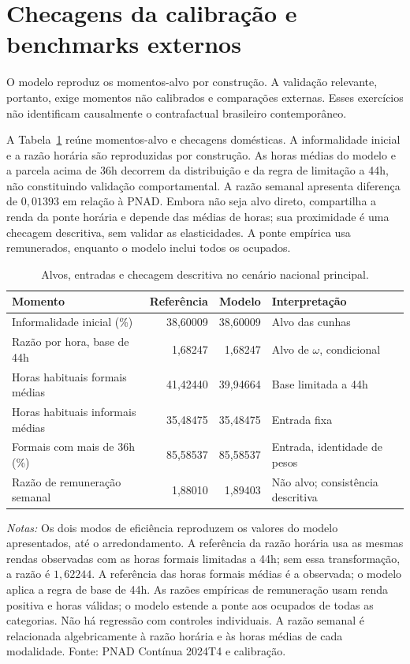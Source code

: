 \section{Checagens da calibração e benchmarks externos}\label{sec:validation}

O modelo reproduz os momentos-alvo por construção. A validação relevante, portanto, exige momentos não calibrados e comparações externas. Esses exercícios não identificam causalmente o contrafactual brasileiro contemporâneo.

A Tabela~\ref{tab:calibration_fit} reúne momentos-alvo e checagens domésticas. A informalidade inicial e a razão horária são reproduzidas por construção. As horas médias do modelo e a parcela acima de 36h decorrem da distribuição e da regra de limitação a 44h, não constituindo validação comportamental. A razão semanal apresenta diferença de $0{,}01393$ em relação à PNAD. Embora não seja alvo direto, compartilha a renda da ponte horária e depende das médias de horas; sua proximidade é uma checagem descritiva, sem validar as elasticidades. A ponte empírica usa remunerados, enquanto o modelo inclui todos os ocupados.

\begin{table}[t]
\centering
\caption{Alvos, entradas e checagem descritiva no cenário nacional principal.}\label{tab:calibration_fit}
\normalsize
\begin{tabular}{@{}p{6.1cm}rrp{4.4cm}@{}}
\toprule
Momento & Referência & Modelo & Interpretação \\
\midrule
Informalidade inicial (\%) & 38{,}60009 & 38{,}60009 & Alvo das cunhas \\
Razão por hora, base de 44h & 1{,}68247 & 1{,}68247 & Alvo de $\omega$, condicional \\
Horas habituais formais médias & 41{,}42440 & 39{,}94664 & Base limitada a 44h \\
Horas habituais informais médias & 35{,}48475 & 35{,}48475 & Entrada fixa \\
Formais com mais de 36h (\%) & 85{,}58537 & 85{,}58537 & Entrada, identidade de pesos \\
Razão de remuneração semanal & 1{,}88010 & 1{,}89403 & Não alvo; consistência descritiva \\
\bottomrule
\end{tabular}
\begin{minipage}{0.97\textwidth}
\normalsize\justifying
\textit{Notas:} Os dois modos de eficiência reproduzem os valores do modelo apresentados, até o arredondamento. A referência da razão horária usa as mesmas rendas observadas com as horas formais limitadas a 44h; sem essa transformação, a razão é $1{,}62244$. A referência das horas formais médias é a observada; o modelo aplica a regra de base de 44h. As razões empíricas de remuneração usam renda positiva e horas válidas; o modelo estende a ponte aos ocupados de todas as categorias. Não há regressão com controles individuais. A razão semanal é relacionada algebricamente à razão horária e às horas médias de cada modalidade. Fonte: PNAD Contínua 2024T4 e calibração.
\end{minipage}
\end{table}

